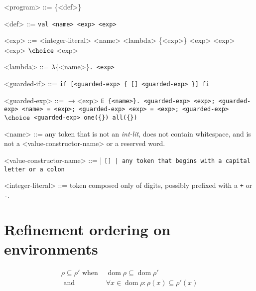 \documentclass[]{article}
\DeclareMathOperator{\dom}{dom}
\begin{document}
\begin{grammar}
    <program> ::= \{{<def>}\}
    
    <def> ::= \tt{val} <name> <exp>
        \alt <exp>
    
        
        
        <exp> ::= <integer-literal>
        \alt <name>
        \alt <lambda>
         \{<exp>\}
        \alt <exp> <exp>
        \alt <exp> $\choice$ <exp>
        
        
        <lambda> ::= $\lambda$\{<name>\}\tt{.} <exp>
        
        <guarded-if> ::= \tt{if}  [<guarded-exp> \{ [] <guarded-exp> \}] \tt{fi}
        
        
        <guarded-exp> ::= $\boldsymbol{\rightarrow}$<exp>
        \alt  \tt{E} \{<name>\}\tt{.} <guarded-exp>
        \alt  <exp>\tt{;} <guarded-exp>
        \alt   <name> \tt{=} <exp>\tt{;} <guarded-exp>
        \alt   <exp> \tt{=} <exp>\tt{;} <guarded-exp>
         $\choice$ <guarded-exp> 
        \alt   \tt{one}(\{<guarded-exp>\})
        \alt   \tt{all}(\{<guarded-exp>\})
        
        <name> ::= any token that is not an \textit{int-lit}, does not contain 
        whitespace,
        and is not a <value-constructor-name> or a reserved word.

        <value-constructor-name> ::= \cons | \tt{[]} | any token that begins
        with a capital letter or a colon
    
        <integer-literal> ::= token composed only of digits, possibly prefixed with a \texttt{+} or \texttt{-}.
    
    \end{grammar}




        
\section{Refinement ordering on environments}

\begin{align*}
\rho \subseteq \rho' \text{ when }&\dom\rho  \subseteq \dom \rho'\\
\text{ and } &\forall x \in \dom \rho: \rho(x) \subseteq \rho'(x)
\end{align*}
\end{document}

